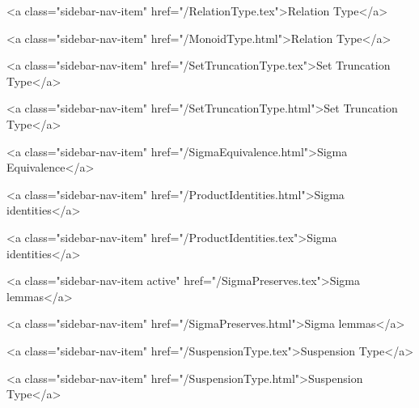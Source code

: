       
    
      
        
          <a class="sidebar-nav-item" href="/RelationType.tex">Relation Type</a>
        
      
    
      
        
          <a class="sidebar-nav-item" href="/MonoidType.html">Relation Type</a>
        
      
    
      
        
          <a class="sidebar-nav-item" href="/SetTruncationType.tex">Set Truncation Type</a>
        
      
    
      
        
          <a class="sidebar-nav-item" href="/SetTruncationType.html">Set Truncation Type</a>
        
      
    
      
        
          <a class="sidebar-nav-item" href="/SigmaEquivalence.html">Sigma Equivalence</a>
        
      
    
      
        
          <a class="sidebar-nav-item" href="/ProductIdentities.html">Sigma identities</a>
        
      
    
      
        
          <a class="sidebar-nav-item" href="/ProductIdentities.tex">Sigma identities</a>
        
      
    
      
        
          <a class="sidebar-nav-item active" href="/SigmaPreserves.tex">Sigma lemmas</a>
        
      
    
      
        
          <a class="sidebar-nav-item" href="/SigmaPreserves.html">Sigma lemmas</a>
        
      
    
      
        
          <a class="sidebar-nav-item" href="/SuspensionType.tex">Suspension Type</a>
        
      
    
      
        
          <a class="sidebar-nav-item" href="/SuspensionType.html">Suspension Type</a>
        
